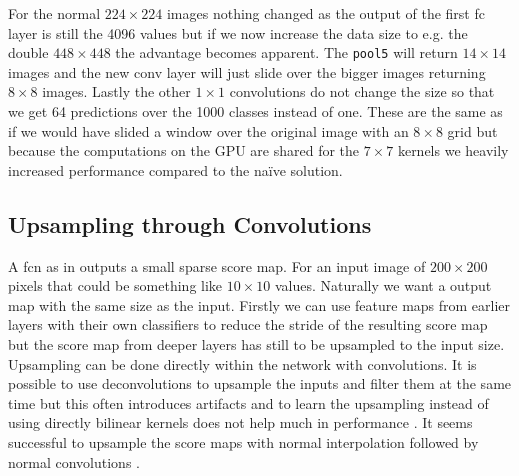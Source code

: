 For the normal $224\times224$ images nothing changed as the output of the first \gls{fc} layer is still the 4096 values but if we now increase the data size to e.g. the double $448\times448$ the advantage becomes apparent. The \texttt{pool5} will return $14\times14$ images and the new \gls{conv} layer will just slide over the bigger images returning $8\times8$ images. Lastly the other $1\times1$ convolutions do not change the size so that we get 64 predictions over the 1000 classes instead of one. These are the same as if we would have slided a window over the original image with an $8\times8$ grid but because the computations on the GPU are shared for the $7\times7$ kernels we heavily increased performance compared to the naïve solution.

\subsection{Upsampling through Convolutions}
\label{sub:concepts:fcn:upsampling}
A \gls{fcn} as in \citep{long_fully_2015} outputs a small sparse score map. For an input image of $200\times 200$ pixels that could be something like $10\times 10$ values. Naturally we want a output map with the same size as the input. Firstly we can use feature maps from earlier layers with their own classifiers to reduce the stride of the resulting score map but the score map from deeper layers has still to be upsampled to the input size. Upsampling can be done directly within the network with convolutions. It is possible to use deconvolutions to upsample the inputs and filter them at the same time but this often introduces artifacts \citep{odena_deconvolution_2016} and to learn the upsampling instead of using directly bilinear kernels does not help much in performance \citep{shelhamer_fully_2016}. It seems successful to upsample the score maps with normal interpolation followed by normal convolutions \citep{dong_image_2016}.

